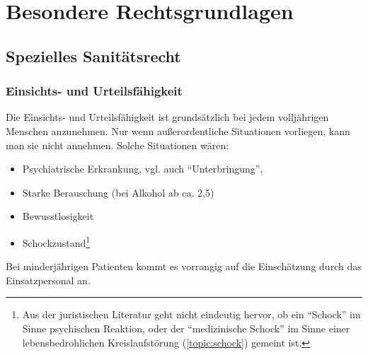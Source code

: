 \section{Besondere Rechtsgrundlagen}

\subsection{Spezielles Sanitätsrecht}



\subsubsection{Einsichts- und Urteilsfähigkeit}

\label{topic:urteilsfaehigkeit}

Die Einsichts- und Urteilsfähigkeit ist grundsätzlich bei
jedem volljährigen Menschen anzunehmen. Nur wenn
außerordentliche Situationen vorliegen, kann man sie nicht
annehmen. Solche Situationen wären:

\begin{itemize}
  \item Psychiatrische Erkrankung, vgl. auch
  \enquote{Unterbringung},
  \item Starke Berauschung (bei Alkohol ab ca.
  2,5{\textperthousand})
  \item Bewusstlosigkeit
  \item Schockzustand\footnote{Aus der juristischen
  Literatur geht nicht eindeutig hervor, ob ein \enquote{Schock}
  im Sinne psychischen Reaktion, oder der \enquote{medizinische
  Schock} im Sinne einer
  lebensbedrohlichen Kreislaufstörung (\ref{topic:schock})
  gemeint ist.}
\end{itemize}

Bei minderjährigen Patienten kommt es vorrangig auf die
Einschätzung durch das Einsatzpersonal an. 

